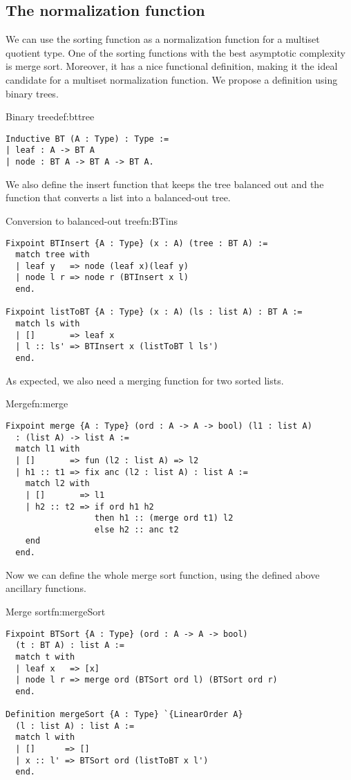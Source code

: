 \subsection{The normalization function}
We can use the sorting function as a normalization function for a multiset quotient type. One of the sorting functions with the best asymptotic complexity is merge sort. Moreover, it has a nice functional definition, making it the ideal candidate for a multiset normalization function. We propose a definition using binary trees.
\begin{defi}{Binary tree}{def:bttree}
\begin{verbatim}
Inductive BT (A : Type) : Type :=
| leaf : A -> BT A
| node : BT A -> BT A -> BT A.
\end{verbatim}
\end{defi}
We also define the insert function that keeps the tree balanced out and the function that converts a list into a balanced-out tree.
\begin{func}{Conversion to balanced-out tree}{fn:BTins}
\begin{verbatim}
Fixpoint BTInsert {A : Type} (x : A) (tree : BT A) :=
  match tree with
  | leaf y   => node (leaf x)(leaf y)
  | node l r => node r (BTInsert x l)
  end.

Fixpoint listToBT {A : Type} (x : A) (ls : list A) : BT A :=
  match ls with
  | []       => leaf x
  | l :: ls' => BTInsert x (listToBT l ls')
  end.
\end{verbatim}
\end{func}
As expected, we also need a merging function for two sorted lists.
\begin{func}{Merge}{fn:merge}
\begin{verbatim}
Fixpoint merge {A : Type} (ord : A -> A -> bool) (l1 : list A) 
  : (list A) -> list A :=
  match l1 with
  | []       => fun (l2 : list A) => l2
  | h1 :: t1 => fix anc (l2 : list A) : list A :=
    match l2 with
    | []       => l1
    | h2 :: t2 => if ord h1 h2 
                  then h1 :: (merge ord t1) l2
                  else h2 :: anc t2
    end
  end.
\end{verbatim}
\end{func}
Now we can define the whole merge sort function, using the defined above ancillary functions.
\begin{func}{Merge sort}{fn:mergeSort}
\begin{verbatim}
Fixpoint BTSort {A : Type} (ord : A -> A -> bool) 
  (t : BT A) : list A :=
  match t with
  | leaf x   => [x]
  | node l r => merge ord (BTSort ord l) (BTSort ord r)
  end. 

Definition mergeSort {A : Type} `{LinearOrder A}
  (l : list A) : list A :=
  match l with
  | []      => []
  | x :: l' => BTSort ord (listToBT x l')
  end.
\end{verbatim}
\end{func}
